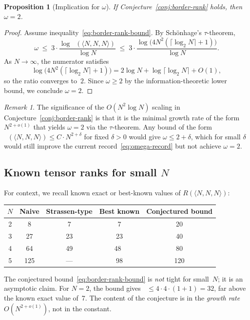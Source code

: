 \documentclass[11pt,a4paper]{article}
\newtheorem{proposition}[theorem]{Proposition}
\theoremstyle{definition}
\theoremstyle{remark}
\newtheorem{remark}[theorem]{Remark}
\DeclareMathOperator{\brank}{\underline{R}}
\newcommand{\mmtensor}[3]{\langle #1, #2, #3 \rangle}
\begin{document}
\begin{proposition}[Implication for $\omega$]\label{prop:omega-implication}
If Conjecture~\ref{conj:border-rank} holds, then $\omega = 2$.
\end{proposition}

\begin{proof}
Assume inequality~\eqref{eq:border-rank-bound}. By Sch\"onhage's
$\tau$-theorem,
\[
  \omega \;\le\; 3 \cdot \frac{\log \brank(\mmtensor{N}{N}{N})}{\log N}
  \;\le\; 3 \cdot \frac{\log\bigl(4N^2(\lceil \log_2 N \rceil + 1)\bigr)}
                        {\log N}.
\]
As $N \to \infty$, the numerator satisfies
\[
  \log\bigl(4N^2(\lceil \log_2 N \rceil + 1)\bigr)
  = 2\log N + \log\lceil \log_2 N \rceil + O(1),
\]
so the ratio converges to~$2$. Since $\omega \ge 2$ by the
information-theoretic lower bound, we conclude $\omega = 2$.
\end{proof}

\begin{remark}
The significance of the $O(N^2 \log N)$ scaling in
Conjecture~\ref{conj:border-rank} is that it is the minimal
growth rate of the form $N^{2+o(1)}$ that yields $\omega = 2$ via
the $\tau$-theorem. Any bound of the form $\brank(\mmtensor{N}{N}{N})
\le C \cdot N^{2+\delta}$ for fixed $\delta > 0$ would give
$\omega \le 2 + \delta$, which for small $\delta$ would still
improve the current record~\eqref{eq:omega-record} but not
achieve $\omega = 2$.
\end{remark}

\subsection{Known tensor ranks for small $N$}

For context, we recall known exact or best-known values of
$R(\mmtensor{N}{N}{N})$:

\begin{center}
\begin{tabular}{c|c|c|c|c}
$N$ & Naive & Strassen-type & Best known & Conjectured bound \\ \hline
2 & 8 & 7 & 7 & 20 \\
3 & 27 & 23 & 23 & 40 \\
4 & 64 & 49 & 48~\cite{AlphaEvolve2025} & 80 \\
5 & 125 & --- & 98 & 120 \\
\end{tabular}
\end{center}

\noindent The conjectured bound~\eqref{eq:border-rank-bound} is
\emph{not} tight for small~$N$; it is an asymptotic claim. For
$N = 2$, the bound gives $\brank \le 4 \cdot 4 \cdot (1+1) = 32$,
far above the known exact value of~7. The content of the conjecture
is in the \emph{growth rate} $O(N^{2+o(1)})$, not in the constant.
\end{document}
